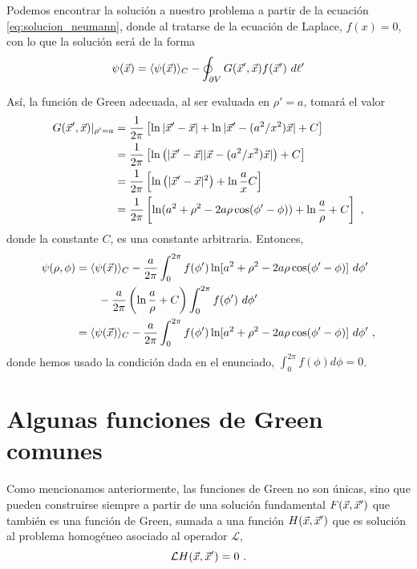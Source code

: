 \begin{ejemplo}
    Podemos encontrar la solución a nuestro problema a partir de la ecuación \eqref{eq:solucion_neumann}, donde al tratarse de la ecuación de Laplace, $f(x) = 0$, con lo que la solución será de la forma
    \begin{equation*}
        \psi(\vec{x}) = \langle \psi(\vec{x}) \rangle_{C} - \oint_{\partial V} G(\vec{x}', \vec{x}) f(\vec{x}') \ d\ell' 
    \end{equation*}

    Así, la función de Green adecuada, al ser evaluada en $\rho' = a$, tomará el valor
    \begin{align*}
        G(\vec{x}',\vec{x})|_{\rho' = a} & = \frac{1}{2\pi} \left[ \ln |\vec{x}' - \vec{x}| + \ln |\vec{x}' - (a^2/x^2)\vec{x}| + C \right] \\
        & = \frac{1}{2\pi} \left[ \ln\left( |\vec{x}' - \vec{x}| |\vec{x} - (a^2/x^2)\vec{x}| \right) + C \right] \\
        & = \frac{1}{2\pi} \left[ \ln\left( |\vec{x}' - \vec{x}|^2 \right) + \ln\frac{a}{x} C \right] \\
        & = \frac{1}{2\pi} \left[ \ln(a^2 + \rho^2 - 2 a \rho \cos(\phi' - \phi)) + \ln \frac{a}{\rho} + C \right] \ ,
    \end{align*}
    donde la constante $C$, es una constante arbitraria. Entonces,
    \begin{align*}
        \psi(\rho, \phi) & = \langle \psi(\x) \rangle_C - \frac{a}{2\pi} \int_0^{2\pi} f(\phi') \ln[a^2 + \rho^2 - 2a\rho \cos(\phi' - \phi)] \ d\phi' \\
        & \qquad - \frac{a}{2\pi} \left(\ln \frac{a}{\rho} + C \right) \int_0^{2\pi} f(\phi') \ d\phi' \\
        & = \langle \psi(\x) \rangle_C - \frac{a}{2\pi} \int_0^{2\pi} f(\phi') \ln[a^2 + \rho^2 - 2a\rho \cos(\phi' - \phi)] \ d\phi' \ ,
    \end{align*}
    donde hemos usado la condición dada en el enunciado, $\int_0^{2\pi} f(\phi) d\phi = 0$. 

\end{ejemplo}


\section{Algunas funciones de Green comunes}

Como mencionamos anteriormente, las funciones de Green no son únicas, sino que pueden construirse siempre a partir de una solución fundamental $F(\vec{x},\vec{x}')$ que también es una función de Green, sumada a una función $H(\vec{x},\vec{x}')$ que es solución al problema homogéneo asociado al operador $\mathcal{L}$,
\begin{equation}
    \mathcal{L} H(\vec{x},\vec{x}') = 0 \ .
\end{equation} 

